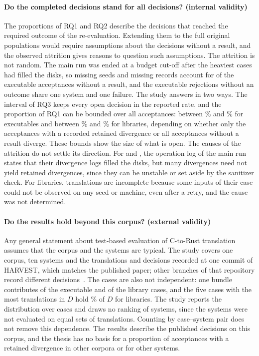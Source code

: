 \paragraph{Do the completed decisions stand for all decisions? (internal validity)} The proportions of RQ1 and RQ2 describe the decisions that reached the required outcome of the re-evaluation. Extending them to the full original populations would require assumptions about the decisions without a result, and the observed attrition gives reasons to question such assumptions. The attrition is not random. The main run was ended at a budget cut-off after the heaviest cases had filled the disks, so missing seeds and missing records account for \rqUnfinishedExeAllNum{} of the \rqLpExeAllNum{} executable acceptances without a result, and the \rqFFNotReexExeAllNum{} executable rejections without an outcome share one system and one failure. The study answers in two ways. The interval of RQ3 keeps every open decision in the reported rate, and the proportion of RQ1 can be bounded over all acceptances: between \rqFPBoundLoTightExeAllPct\% and \rqFPBoundHiExeAllPct\% for executables and between \rqFPBoundLoTightLibAllPct\% and \rqFPBoundHiLibAllPct\% for libraries, depending on whether only the acceptances with a recorded retained divergence or all acceptances without a result diverge. These bounds show the size of what is open. The causes of the attrition do not settle its direction. For  and , the operation log of the main run states that their divergence logs filled the disks, but many divergences need not yield retained divergences, since they can be unstable or set aside by the sanitizer check. For libraries, \rqLeaveIncompleteLibAllNum{} translations are incomplete because some inputs of their case could not be observed on any seed or machine, even after a retry, and the cause was not determined.

\paragraph{Do the results hold beyond this corpus? (external validity)} Any general statement about test-based evaluation of C-to-Rust translation assumes that the corpus and the systems are typical. The study covers one corpus, ten systems and the translations and decisions recorded at one commit of HARVEST, which matches the published paper; other branches of that repository record different decisions~\cite{harvest-results}. The cases are also not independent: one bundle contributes \nExePzeroP{} of the \nExePrimary{} executable and \nLibPzeroP{} of the \nLibPrimary{} library cases, and the five cases with the most translations in $D$ hold \rqAxTwoTopFiveLibPct\% of $D$ for libraries. The study reports the distribution over cases and draws no ranking of systems, since the systems were not evaluated on equal sets of translations. Counting by case--system pair does not remove this dependence. The results describe the published decisions on this corpus, and the thesis has no basis for a proportion of acceptances with a retained divergence in other corpora or for other systems.


